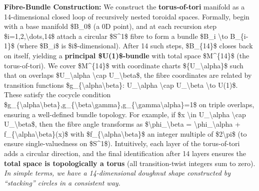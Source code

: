 \documentclass[]{article}
\begin{document}
\textbf{Fibre-Bundle Construction:} We construct the
\textbf{torus‑of‑tori} manifold as a 14-dimensional closed loop of
recursively nested toroidal spaces. Formally, begin with a base manifold
\$B\_0\$ (a 0D point), and at each recursion step
\$i=1,2,\textbackslash{}dots,14\$ attach a circular \$S\^{}1\$ fibre to
form a bundle \$B\_i \textbackslash{}to B\_\{i-1\}\$ (where \$B\_i\$ is
\$i\$-dimensional). After 14 such steps, \$B\_\{14\}\$ closes back on
itself, yielding a \textbf{principal \$U(1)\$-bundle} with total space
\$M\^{}\{14\}\$ (the torus-of-tori). We cover \$M\^{}\{14\}\$ with
coordinate charts \$\{U\_\textbackslash{}alpha\}\$ such that on overlaps
\$U\_\textbackslash{}alpha \textbackslash{}cap
U\_\textbackslash{}beta\$, the fibre coordinates are related by
transition functions \$g\_\{\textbackslash{}alpha\textbackslash{}beta\}:
U\_\textbackslash{}alpha \textbackslash{}cap U\_\textbackslash{}beta
\textbackslash{}to U(1)\$. These satisfy the cocycle condition
\$g\_\{\textbackslash{}alpha\textbackslash{}beta\},g\_\{\textbackslash{}beta\textbackslash{}gamma\},g\_\{\textbackslash{}gamma\textbackslash{}alpha\}=1\$
on triple overlaps, ensuring a well-defined bundle topology. For
example, if \$x \textbackslash{}in U\_\textbackslash{}alpha
\textbackslash{}cap U\_\textbackslash{}beta\$, then the fibre angle
transforms as \$\textbackslash{}phi\_\textbackslash{}beta =
\textbackslash{}phi\_\textbackslash{}alpha +
f\_\{\textbackslash{}alpha\textbackslash{}beta\}(x)\$ with
\$f\_\{\textbackslash{}alpha\textbackslash{}beta\}\$ an integer multiple
of \$2\textbackslash{}pi\$ (to ensure single-valuedness on \$S\^{}1\$).
Intuitively, each layer of the torus-of-tori adds a circular direction,
and the final identification after 14 layers ensures the \textbf{total
space is topologically a torus} (all transition-twist integers sum to
zero). \emph{In simple terms, we have a 14-dimensional doughnut shape
constructed by ``stacking'' circles in a consistent way.}
\end{document}
